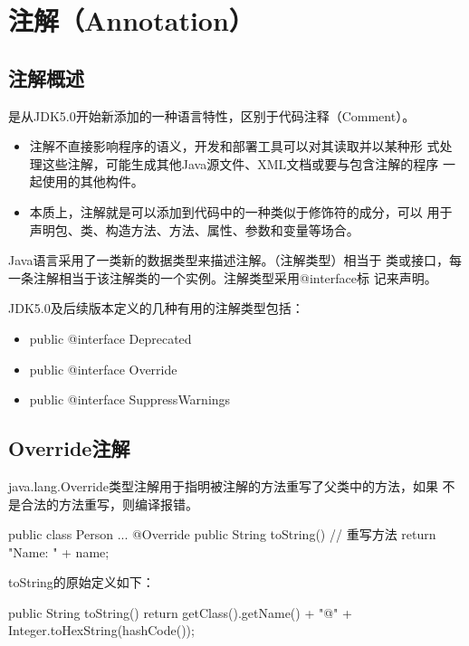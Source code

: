 \section{注解（Annotation）}

\subsection{注解概述}

是从JDK5.0开始新添加的一种语言特性，区别于代码注释（Comment）。

\begin{itemize}
\item 注解不直接影响程序的语义，开发和部署工具可以对其读取并以某种形
  式处理这些注解，可能生成其他Java源文件、XML文档或要与包含注解的程序
  一起使用的其他构件。
\item 本质上，注解就是可以添加到代码中的一种类似于修饰符的成分，可以
  用于声明包、类、构造方法、方法、属性、参数和变量等场合。
\end{itemize}

Java语言采用了一类新的数据类型来描述注解。（{\hei\Red 注解类型}）相当于
类或接口，每一条注解相当于该注解类的一个实例。注解类型采用@interface标
记来声明。

JDK5.0及后续版本定义的几种有用的注解类型包括：
  
\begin{itemize}
\item public @interface Deprecated
\item public @interface Override
\item public @interface SuppressWarnings
\end{itemize}


\subsection{Override注解}

java.lang.Override类型注解用于指明被注解的方法重写了父类中的方法，如果
不是合法的方法重写，则编译报错。

\begin{javaCode}
  public class Person {
    ...
    @Override
    public String toString() { // 重写方法
      return "Name: " + name; 
    }
  }
\end{javaCode}

toString的原始定义如下：

\begin{javaCode}
  public String toString() {
    return getClass().getName() + "@" + Integer.toHexString(hashCode());
  }  
\end{javaCode}

